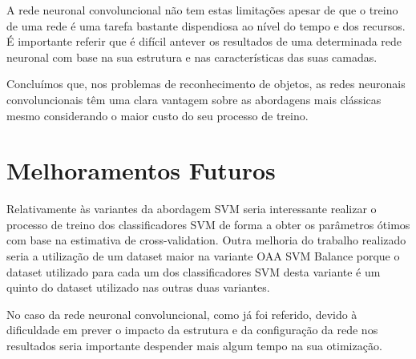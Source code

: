 \documentclass[extendedabs]{vcom}
\begin{document}
A rede neuronal convoluncional não tem estas limitações apesar de que o treino de uma rede é uma tarefa bastante dispendiosa ao nível do tempo e dos recursos. É importante referir que é difícil antever os resultados de uma determinada rede neuronal com base na sua estrutura e nas características das suas camadas.

Concluímos que, nos problemas de reconhecimento de objetos, as redes neuronais convoluncionais têm uma clara vantagem sobre as abordagens mais clássicas mesmo considerando o maior custo do seu processo de treino.

\section{Melhoramentos Futuros}
Relativamente às variantes da abordagem SVM seria interessante realizar o processo de treino dos classificadores SVM de forma a obter os parâmetros ótimos com base na estimativa de cross-validation. Outra melhoria do trabalho realizado seria a utilização de um dataset maior na variante OAA SVM Balance porque o dataset utilizado para cada um dos classificadores SVM desta variante é um quinto do dataset utilizado nas outras duas variantes. 

No caso da rede neuronal convoluncional, como já foi referido, devido à dificuldade em prever o impacto da estrutura e da configuração da rede nos resultados seria importante despender mais algum tempo na sua otimização.  

{}

\end{document}
